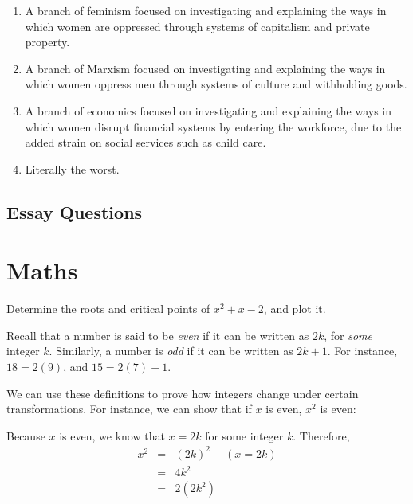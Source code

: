 \documentclass[11pt]{exam}
\def\QED{\ensuremath{{\square}}}
\def\markatright#1{\leavevmode\unskip\nobreak\quad\hspace*{\fill}{#1}}
\newenvironment{proof}
  {\begin{trivlist}\item[\hskip\labelsep{\bf Proof.}]}
  {\markatright{\QED}\end{trivlist}}
\begin{document}
\begin{questions}
\begin{enumerate}
\begin{enumerate}
\item A branch of feminism focused on investigating and explaining the ways in which women
are oppressed through systems of capitalism and private property.
\item A branch of Marxism focused on investigating and explaining the ways in which women
oppress men through systems of culture and withholding goods.
\item A branch of economics focused on investigating and explaining the ways in which
women disrupt financial systems by entering the workforce, due to the added strain on
social services such as child care.
\item Literally the worst.
\end{enumerate}



\end{enumerate}

\newpage
\subsection{Essay Questions}
\vfill






\newpage
\section{Maths}

\question[6] Determine the roots and critical points of $x^2 + x - 2$, and plot
it.
\vfill




\newpage
\question Recall that a number is said to be \emph{even} if it can be written
as $2k$, for \emph{some} integer $k$. Similarly, a number is \emph{odd} if it
can be written as $2k + 1$. For instance, $18 = 2(9)$, and $15 = 2(7) + 1$.

We can use these definitions to prove how integers change under certain
transformations. For instance, we can show that if $x$ is even, $x^2$ is even:

\begin{proof}
Because $x$ is even, we know that $x = 2k$ for some integer $k$. Therefore,
\[\begin{array}{rclr}
x^2 &=& (2k)^2 & (x = 2k) \\
&=& 4k^2 & \\
&=& 2(2k^2) & \\
\end{array}\]


\end{proof}
\end{questions}
\end{document}
